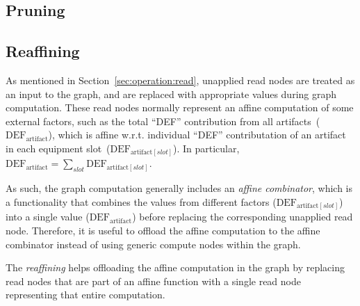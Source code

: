 \documentclass{article}
\begin{document}
\subsection{Pruning}

\subsection{Reaffining}

As mentioned in Section~\ref{sec:operation:read}, unapplied read nodes are treated as an input to the graph, and are replaced with appropriate values during graph computation.
These read nodes normally represent an affine computation of some external factors, such as the total ``DEF'' contribution from all artifacts~($\text{DEF}_\text{artifact}$), which is affine w.r.t. individual ``DEF'' contributation of an artifact in each equipment slot~($\text{DEF}_{\text{artifact}[slot]}$).
In particular, $\text{DEF}_\text{artifact} = \sum_{slot} \text{DEF}_{\text{artifact}[slot]}$.

As such, the graph computation generally includes an \emph{affine combinator}, which is a functionality that combines the values from different factors ($\text{DEF}_{\text{artifact}[slot]}$) into a single value ($\text{DEF}_\text{artifact}$) before replacing the corresponding unapplied read node.
Therefore, it is useful to offload the affine computation to the affine combinator instead of using generic compute nodes within the graph.

The \emph{reaffining} helps offloading the affine computation in the graph by replacing read nodes that are part of an affine function with a single read node representing that entire computation.
\end{document}
